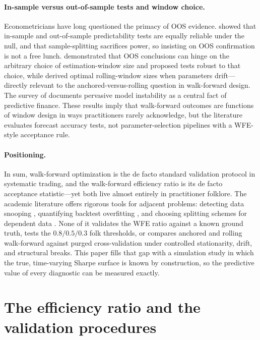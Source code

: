 \documentclass[11pt]{article}
\begin{document}
\paragraph{In-sample versus out-of-sample tests and window choice.}
Econometricians have long questioned the primacy of OOS evidence.
\citet{inoue2005insample} showed that in-sample and out-of-sample
predictability tests are equally reliable under the null, and that
sample-splitting sacrifices power, so insisting on OOS confirmation is not a
free lunch. \citet{rossi2012outofsample} demonstrated that OOS conclusions
can hinge on the arbitrary choice of estimation-window size and proposed
tests robust to that choice, while \citet{inoue2017rolling} derived optimal
rolling-window sizes when parameters drift---directly relevant to the
anchored-versus-rolling question in walk-forward design. The survey of
\citet{rossi2013exchange} documents pervasive model instability as a central
fact of predictive finance. These results imply that walk-forward outcomes
are functions of window design in ways practitioners rarely acknowledge, but
the literature evaluates forecast accuracy tests, not parameter-selection
pipelines with a WFE-style acceptance rule.

\paragraph{Positioning.}
In sum, walk-forward optimization is the de facto standard validation
protocol in systematic trading, and the walk-forward efficiency ratio is its
de facto acceptance statistic---yet both live almost entirely in practitioner
folklore. The academic literature offers rigorous tools for adjacent
problems: detecting data snooping \citep{white2000reality,hansen2005test},
quantifying backtest overfitting
\citep{bailey2017probability,bailey2014deflated}, and choosing splitting
schemes for dependent data
\citep{bergmeir2012use,lopezdeprado2018advances,cerqueira2020evaluating}.
None of it validates the WFE ratio against a known ground truth, tests the
$0.8/0.5/0.3$ folk thresholds, or compares anchored and rolling walk-forward
against purged cross-validation under controlled stationarity, drift, and
structural breaks. This paper fills that gap with a simulation study in which
the true, time-varying Sharpe surface is known by construction, so the
predictive value of every diagnostic can be measured exactly.

\section{The efficiency ratio and the validation procedures}
\label{sec:wfer}
\end{document}
